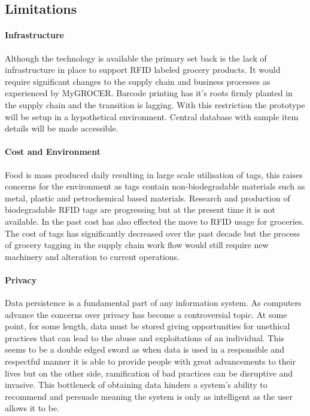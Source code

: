 \documentclass[a4paper, 11pt]{article}
\begin{document}
\vspace{\baselineskip}
\vspace{\baselineskip}
\vspace{\baselineskip}

\subsection{Limitations}

\paragraph{Infrastructure}Although the technology is available the primary set back is the lack of infrastructure in place to support RFID labeled grocery products. It would require significant changes to the supply chain and business processes \cite{pervasiveComp} as experienced by MyGROCER. Barcode printing has it's roots firmly planted in the supply chain and the transition is lagging. With this restriction the prototype will be setup in a hypothetical environment. Central database with sample item details will be made accessible. 

\paragraph{Cost and Environment}Food is mass produced daily resulting in large scale utilisation of tags, this raises concerns for the environment as tags contain non-biodegradable materials such as metal, plastic and petrochemical based materials.\cite{bioTags} Research and production of biodegradable RFID tags are progressing but at the present time it is not available. In the past cost has also effected the move to RFID usage for groceries. The cost of tags has significantly decreased over the past decade but the process of grocery tagging in the supply chain work flow would still require new machinery and alteration to current operations. 

\paragraph{Privacy}Data persistence is a fundamental part of any information system. As computers advance the concerns over privacy has become a controversial topic. At some point, for some length, data must be stored giving opportunities for unethical practices that can lead to the abuse and exploitations of an individual. This seems to be a double edged sword as when data is used in a responsible and respectful manner it is able to provide people with great advancements to their lives but on the other side, ramification of bad practices can be disruptive and invasive. This bottleneck of obtaining data hinders a system's ability to recommend and persuade meaning the system is only as intelligent as the user allows it to be.
\clearpage
\end{document}

